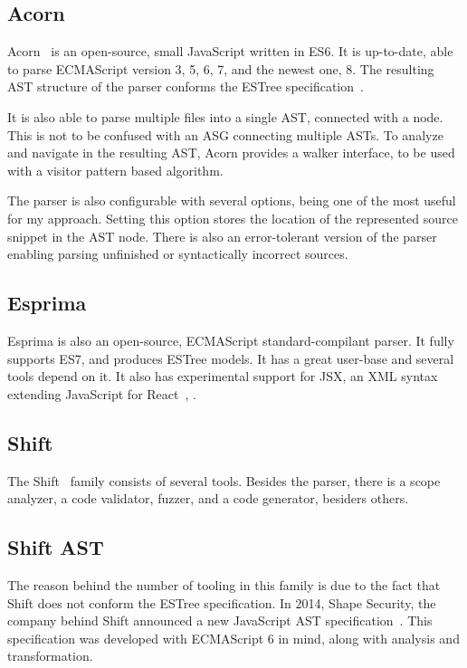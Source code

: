 \subsection{Acorn}
\label{sect:acorn}
Acorn~\cite{acorn} is an open-source, small JavaScript written in ES6. It is up-to-date, able to parse ECMAScript version 3, 5, 6, 7, and the newest one, 8. The resulting AST structure of the parser conforms the ESTree specification~\cite{estree}.

It is also able to parse multiple files into a single AST, connected with a  node. This is not to be confused with an ASG connecting multiple ASTs. To analyze and navigate in the resulting AST, Acorn provides a walker interface, to be used with a visitor pattern based algorithm.

The parser is also configurable with several options,  being one of the most useful for my approach. Setting this option stores the location of the represented source snippet in the AST node. There is also an error-tolerant version of the parser enabling parsing unfinished or syntactically incorrect sources.


\subsection{Esprima}
Esprima is also an open-source, ECMAScript standard-compilant parser. It fully supports ES7, and produces ESTree models. It has a great user-base and several tools depend on it. It also has experimental support for JSX, an XML syntax extending JavaScript for React~\cite{react}, .


\subsection{Shift}
\label{sect:shift}
The Shift~\cite{shift} family consists of several tools. Besides the parser, there is a scope analyzer, a code validator, fuzzer, and a code generator, besiders others.

\subsection{Shift AST}
The reason behind the number of tooling in this family is due to the fact that Shift does not conform the ESTree specification. In 2014, Shape Security, the company behind Shift announced a new JavaScript AST specification~\cite{shift-spec}. This specification was developed with ECMAScript 6 in mind, along with analysis and transformation.

